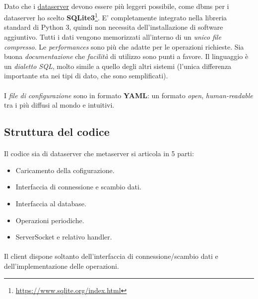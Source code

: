 \documentclass[11pt,a4paper,english]{article}
\begin{document}
\paragraph{} Dato che i \underline{dataserver} devono essere più leggeri possibile, come dbms per i dataserver ho scelto \textbf{SQLite3}\footnote{\url{https://www.sqlite.org/index.html}}. E' completamente integrato nella libreria standard di Python 3, quindi non necessita dell'installazione di software aggiuntivo. Tutti i dati vengono memorizzati all'interno di un \emph{unico file compresso}. Le \emph{performances} sono più che adatte per le operazioni richieste. Sia buona \emph{documentazione} che \emph{facilità} di utilizzo sono punti a favore. Il linguaggio è un \emph{dialetto SQL}, molto simile a quello degli altri sistemi (l'unica differenza importante sta nei tipi di dato, che sono semplificati).  

\paragraph{} I \emph{file di configurazione} sono in formato \textbf{YAML}\cite{yaml}: un formato \emph{open}, \emph{human-readable} tra i più diffusi al mondo e intuitivi. 


\subsection{Struttura del codice}

\paragraph{} Il codice sia di dataserver che metaserver si articola in 5 parti:\begin{itemize}
	\item Caricamento della cofigurazione.
	\item Interfaccia di connessione e scambio dati.
	\item Interfaccia al database.
	\item Operazioni periodiche.
	\item ServerSocket e relativo handler.
\end{itemize}

\paragraph{} Il client dispone soltanto dell'interfaccia di connessione/scambio dati e dell'implementazione delle operazioni. 
\end{document}
